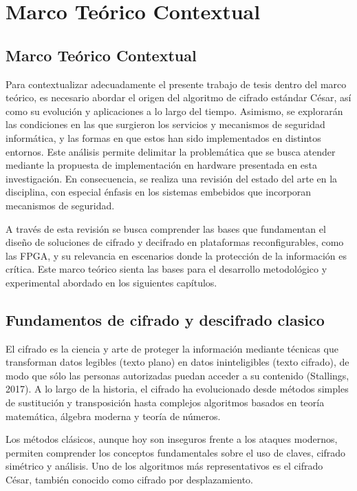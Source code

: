 
\chapter{Marco Teórico Contextual}
\captionsetup[figure]{font=scriptsize}

\section{Marco Teórico Contextual}
Para contextualizar adecuadamente el presente trabajo de tesis dentro del marco teórico, es necesario abordar el origen del algoritmo de cifrado estándar César, así como su evolución y aplicaciones a lo largo del tiempo. Asimismo, se explorarán las condiciones en las que surgieron los servicios y mecanismos de seguridad informática, y las formas en que estos han sido implementados en distintos entornos. Este análisis permite delimitar la problemática que se busca atender mediante la propuesta de implementación en hardware presentada en esta investigación. En consecuencia, se realiza una revisión del estado del arte en la disciplina, con especial énfasis en los sistemas embebidos que incorporan mecanismos de seguridad.

A través de esta revisión se busca comprender las bases que fundamentan el diseño de soluciones de cifrado y decifrado en plataformas reconfigurables, como las FPGA, y su relevancia en escenarios donde la protección de la información es crítica. Este marco teórico sienta las bases para el desarrollo metodológico y experimental abordado en los siguientes capítulos.

\section{Fundamentos de cifrado y descifrado clasico}
El cifrado es la ciencia y arte de proteger la información mediante técnicas que transforman datos legibles (texto plano) en datos ininteligibles (texto cifrado), de modo que sólo las personas autorizadas puedan acceder a su contenido (Stallings, 2017). A lo largo de la historia, el cifrado ha evolucionado desde métodos simples de sustitución y transposición hasta complejos algoritmos basados en teoría matemática, álgebra moderna y teoría de números.

Los métodos clásicos, aunque hoy son inseguros frente a los ataques modernos, permiten comprender los conceptos fundamentales sobre el uso de claves, cifrado simétrico y análisis. Uno de los algoritmos más representativos es el cifrado César, también conocido como cifrado por desplazamiento.

